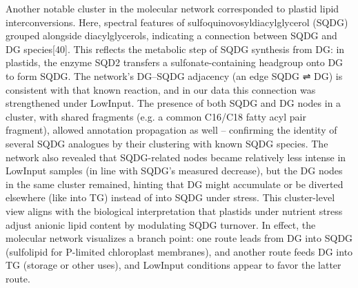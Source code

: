 \documentclass[10pt,letterpaper]{article}
\begin{document}
Another notable cluster in the molecular network corresponded to plastid lipid interconversions. Here, spectral features of sulfoquinovosyldiacylglycerol (SQDG) grouped alongside diacylglycerols, indicating a connection between SQDG and DG species[40]. This reflects the metabolic step of SQDG synthesis from DG: in plastids, the enzyme SQD2 transfers a sulfonate-containing headgroup onto DG to form SQDG. The network’s DG–SQDG adjacency (an edge SQDG ⇌ DG) is consistent with that known reaction, and in our data this connection was strengthened under LowInput. The presence of both SQDG and DG nodes in a cluster, with shared fragments (e.g. a common C16/C18 fatty acyl pair fragment), allowed annotation propagation as well – confirming the identity of several SQDG analogues by their clustering with known SQDG species. The network also revealed that SQDG-related nodes became relatively less intense in LowInput samples (in line with SQDG’s measured decrease), but the DG nodes in the same cluster remained, hinting that DG might accumulate or be diverted elsewhere (like into TG) instead of into SQDG under stress. This cluster-level view aligns with the biological interpretation that plastids under nutrient stress adjust anionic lipid content by modulating SQDG turnover. In effect, the molecular network visualizes a branch point: one route leads from DG into SQDG (sulfolipid for P-limited chloroplast membranes), and another route feeds DG into TG (storage or other uses), and LowInput conditions appear to favor the latter route.
\end{document}
